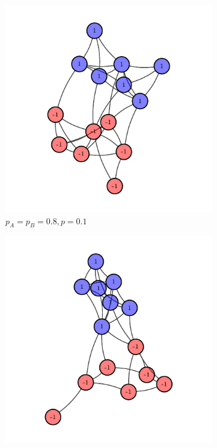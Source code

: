 \documentclass{standalone}
\begin{document}
	\begin{figure}[H]
		\centering
		\begin{subfigure}{0.3\textwidth}
			\includegraphics[scale=0.5]{ig-plots/tmp/large_inter_proba.pdf}
			\caption{$p_A = p_B = 0.8, p=0.1$}
		\end{subfigure}
		\begin{subfigure}{0.3\textwidth}
			\includegraphics[scale=0.5]{ig-plots/tmp/large_small_smaller.pdf}

\end{subfigure}
\end{figure}
\end{document}
